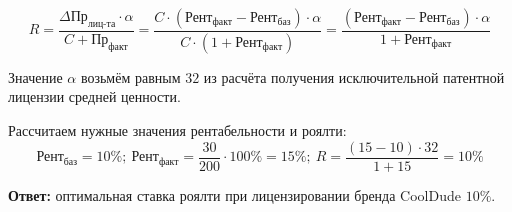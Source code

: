 \documentclass[12pt]{article}
\begin{document}
    \begin{equation}
        \label{eq:royalty}
        R = \frac{\Delta \text{Пр}_\text{лиц-та} \cdot \alpha}{C + \text{Пр}_\text{факт}} = \frac{C \cdot ( \text{Рент}_\text{факт} - \text{Рент}_\text{баз}) \cdot \alpha}{C \cdot (1 +  \text{Рент}_\text{факт})} = \frac{(\text{Рент}_\text{факт} - \text{Рент}_\text{баз}) \cdot \alpha}{1 +  \text{Рент}_\text{факт}}
    \end{equation}

    Значение $\alpha$ возьмём равным $32$ из расчёта получения исключительной патентной лицензии средней ценности.

    Рассчитаем нужные значения рентабельности и роялти:
    \begin{equation}
        \label{eq:profitability}
        \text{Рент}_\text{баз} = 10\%;\
        \text{Рент}_\text{факт} = \frac{30}{200} \cdot 100 \%  = 15\%;\
        R = \frac{(15 - 10) \cdot 32}{1 +  15} = 10\%
    \end{equation}

    \textbf{Ответ:} оптимальная ставка роялти при лицензировании бренда CoolDude $10 \%$.
\end{document}
